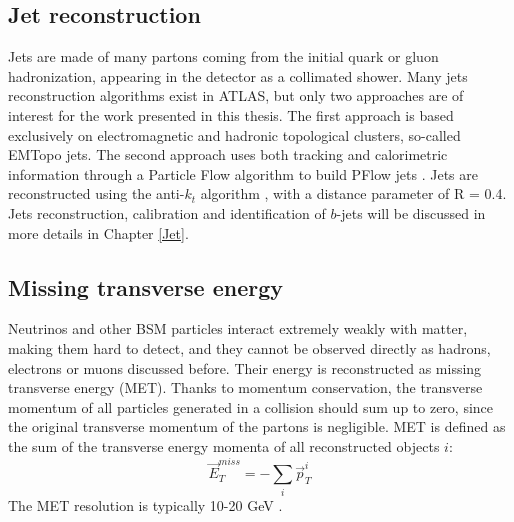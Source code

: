 \subsection{Jet reconstruction}
\label{chap2:Objects:Jet}
Jets are made of many partons coming from the initial quark or gluon hadronization, appearing in the detector as a collimated shower. Many jets reconstruction algorithms exist in ATLAS, but only two approaches are of interest for the work presented in this thesis. The first approach is based exclusively on electromagnetic and hadronic topological clusters, so-called EMTopo jets. The second approach uses both tracking and calorimetric information through a Particle Flow algorithm to build PFlow jets \cite{Jet_Perf_Run2}. Jets are reconstructed using the anti-$k_t$ algorithm \cite{Anti-Kt}, with a distance parameter of R = 0.4. Jets reconstruction, calibration and identification of $b$-jets will be discussed in more details in Chapter \ref{Jet}. 

\subsection{Missing transverse energy}
\label{chap2:Objects:MET}
Neutrinos and other BSM particles interact extremely weakly with matter, making them hard to detect, and they cannot be observed directly as hadrons, electrons or muons discussed before. Their energy is reconstructed as missing transverse energy (MET). Thanks to momentum conservation, the transverse momentum of all particles generated in a collision should sum up to zero, since the original transverse momentum of the partons is negligible. MET is defined as the sum of the transverse energy momenta of all reconstructed objects $i$: 
\begin{equation}
    \vec{E}_{T}^{m i s s}=-\sum_{i} \vec{p}_{T}^{i}
\end{equation}
The MET resolution is typically 10-20 GeV \cite{MET_reso}.